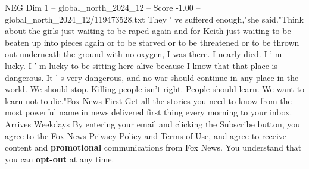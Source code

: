 \begin{textsample}{NEG Dim 1 – global\_north\_2024\_12 – Score -1.00 – global\_north\_2024\_12/119473528.txt}
They ' ve suffered enough,"she said."Think about the girls just waiting to be raped again and for Keith just waiting to be beaten up into pieces again or to be starved or to be threatened or to be thrown out underneath the ground with no oxygen, I was there.
I nearly died.
I ' m lucky.
I ' m lucky to be sitting here alive because I know that that place is dangerous.
It ' s very dangerous, and no war should continue in any place in the world.
We should stop.
Killing people isn't right.
People should learn.
We want to learn not to die."Fox News First Get all the stories you need-to-know from the most powerful name in news delivered first thing every morning to your inbox.
Arrives Weekdays By entering your email and clicking the Subscribe button, you agree to the Fox News Privacy Policy and Terms of Use, and agree to receive content and \textbf{promotional} communications from Fox News.
You understand that you can \textbf{opt-out} at any time.

\end{textsample}
